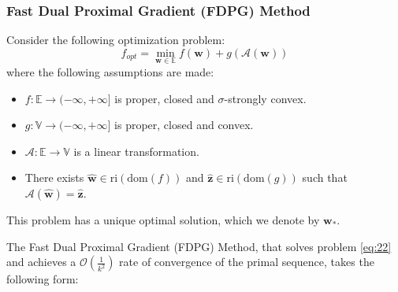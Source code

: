 \documentclass{beamer}
\begin{document}
\begin{frame}



\frametitle{\textbf{Fast Dual Proximal Gradient (FDPG) Method}}


\justifying
Consider the following optimization problem:
\begin{equation}
	\label{eq:22}
	f_{opt} = \min_{\mathbf{w} \in \mathbb{E}} {f\left(\mathbf{w}\right) + g\left(\mathcal{A}(\mathbf{w})\right)}
\end{equation}
where the following assumptions are made:
\begin{itemize}
	\item $f : \mathbb{E} \rightarrow (-\infty,+\infty]$ is proper, closed and $\sigma$-strongly convex.
	\item $g : \mathbb{V} \rightarrow (-\infty,+\infty]$ is proper, closed and convex.
	\item $\mathcal{A} : \mathbb{E} \rightarrow \mathbb{V}$ is a linear transformation.
	\item There exists $\hat{\mathbf{w}} \in \text{ri}(\text{dom}(f))$ and $\hat{\mathbf{z}} \in \text{ri}(\text{dom}(g))$ such that $\mathcal{A}(\hat{\mathbf{w}}) = \hat{\mathbf{z}}$.
\end{itemize}
This problem has a unique optimal solution, which we denote by $\mathbf{w}_{*}$.

\vspace{0.4cm}
\justifying
The Fast Dual Proximal Gradient (FDPG) Method, that solves problem \eqref{eq:22} and achieves a $\mathcal{O}\left(\frac{1}{k^2}\right)$ rate of convergence of the primal sequence, takes the following form:

\end{frame}
\end{document}
